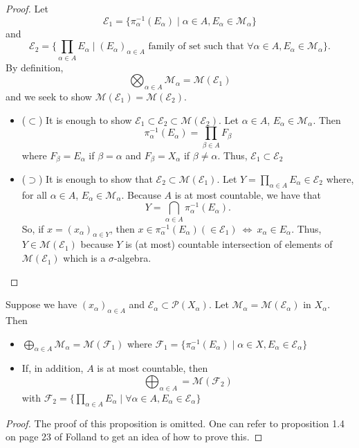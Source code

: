 \documentclass[11pt,leqno,oneside]{amsbook}
\numberwithin{thm}{section}
\renewcommand{\P}{\mathcal{P}}
\newcommand{\M}{\mathcal{M}}
\newcommand{\F}{\mathcal{F}}
\newcommand{\Ep}{\mathcal{E}}
\begin{document}
\begin{proof}
  Let \[
    \Ep_1 = \{\pi_\alpha^{-1}(E_\alpha) \mid \alpha \in A, E_\alpha
    \in \M_\alpha\}
  \]
  and \[
    \Ep_2 = \{\prod_{\alpha \in A} E_\alpha \mid (E_\alpha)_{\alpha
      \in A} \text{ family of set such that } \forall \alpha \in A,
    E_\alpha \in \M_\alpha \}.
  \]
  By definition, \[
    \bigotimes_{\alpha \in A} \M_\alpha = \M(\Ep_1)
  \]
  and we seek to show $\M(\Ep_1) = \M(\Ep_2)$.
  \begin{itemize}
  \item ($\subset$) It is enough to show $\Ep_1 \subset \Ep_2 \subset
    \M(\Ep_2)$. Let $\alpha \in A$, $E_\alpha \in \M_\alpha$. Then \[
      \pi_\alpha^{-1}(E_\alpha) = \prod_{\beta \in A} F_\beta
    \]
    where $F_\beta = E_\alpha$ if $\beta = \alpha$ and $F_\beta =
    X_\alpha$ if $\beta \neq \alpha$. Thus, $\Ep_1 \subset \Ep_2$

  \item ($\supset$) It is enough to show that $\Ep_2 \subset
    \M(\Ep_1)$. Let $Y = \prod_{\alpha \in A} E_\alpha \in \Ep_2$
    where, for all $\alpha \in A$, $E_\alpha \in \M_\alpha$. Because
    $A$ is at most countable, we have that \[
      Y = \bigcap_{\alpha \in A} \pi_\alpha^{-1}(E_\alpha).
    \]
    So, if $x = (x_\alpha)_{\alpha \in Y}$, then $x \in
    \pi_\alpha^{-1}(E_\alpha) (\in \Ep_1) \ \iff \ x_\alpha \in
    E_\alpha$. Thus, $Y \in \M(\Ep_1)$ because $Y$ is (at most) countable
    intersection of elements of $\M(\Ep_1)$ which is a $\sigma$-algebra.
  \end{itemize}
\end{proof}
\begin{prop}
  Suppose we have $(x_\alpha)_{\alpha \in A}$ and $\Ep_\alpha \subset
  \P(X_\alpha)$. Let $\M_\alpha = \M(\Ep_\alpha)$ in $X_\alpha$. Then
  \begin{itemize}
  \item $\bigoplus_{\alpha \in A} \M_\alpha = \M(\F_1)$ where $\F_1 =
    \{\pi_\alpha^{-1}(E_\alpha) \mid \alpha \in X, E_\alpha \in \Ep_\alpha\}$
  \item If, in addition, $A$ is at most countable, then \[
      \bigoplus_{\alpha \in A} = \M(\F_2)
    \]
    with $\F_2 = \{\prod_{\alpha \in A} E_\alpha \mid \forall \alpha
    \in A, E_\alpha \in \Ep_\alpha\}$
  \end{itemize}
\end{prop}
\begin{proof}
  The proof of this proposition is omitted. One can refer to
  proposition 1.4 on page 23 of Folland to get an idea of how to prove this.
\end{proof}
\end{document}
